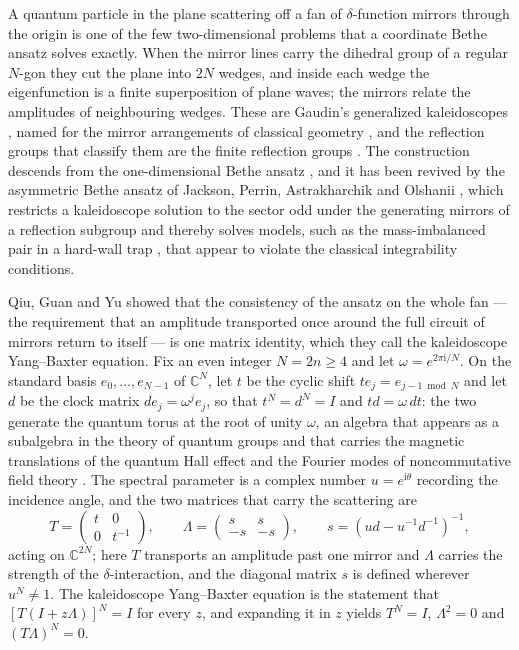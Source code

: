 \documentclass[11pt,reqno]{amsart}
\theoremstyle{plain}
\theoremstyle{definition}
\theoremstyle{remark}
\numberwithin{equation}{section}
\begin{document}
A quantum particle in the plane scattering off a fan of $\delta$-function
mirrors through the origin is one of the few two-dimensional problems that a
coordinate Bethe ansatz solves exactly. When the mirror lines carry the
dihedral group of a regular $N$-gon they cut the plane into $2N$ wedges, and
inside each wedge the eigenfunction is a finite superposition of plane waves;
the mirrors relate the amplitudes of neighbouring wedges. These are Gaudin's
generalized kaleidoscopes \cite[Ch.~5]{Gaudin_Book}, named for the mirror
arrangements of classical geometry \cite{Coxeter_Bookig}, and the reflection
groups that classify them are the finite reflection groups
\cite{Humphreys_Book}. The construction descends from the one-dimensional
Bethe ansatz \cite{Bethe_1931zt,Lieb_1963ea,Lieb_1963ea-1,Yang_1967se,Gaudin_1967us,Yang_1966od,Batchelor_2007tb},
and it has been revived by the asymmetric Bethe ansatz of Jackson, Perrin,
Astrakharchik and Olshanii \cite{Jackson_2024ab,Olshanii_2025es}, which
restricts a kaleidoscope solution to the sector odd under the generating
mirrors of a reflection subgroup \cite{Tumarkin_2005rs} and thereby solves
models, such as the mass-imbalanced pair in a hard-wall trap
\cite{Liu_2019mi}, that appear to violate the classical integrability
conditions.

Qiu, Guan and Yu \cite{Qiu_2026ky} showed that the consistency of the ansatz
on the whole fan --- the requirement that an amplitude transported once around
the full circuit of mirrors return to itself --- is one matrix identity, which
they call the kaleidoscope Yang--Baxter equation. Fix an even integer
$N=2n\ge4$ and let $\omega=e^{2\pi\mathrm{i}/N}$. On the standard basis
$e_{0},\dots,e_{N-1}$ of $\mathbb{C}^{N}$, let $t$ be the cyclic shift
$te_{j}=e_{j-1\bmod N}$ and let $d$ be the clock matrix $de_{j}=\omega^{j}e_{j}$,
so that $t^{N}=d^{N}=I$ and $td=\omega\,dt$: the two generate the quantum
torus at the root of unity $\omega$, an algebra that appears as a subalgebra in
the theory of quantum groups \cite{Levendorskii_1991ao} and that carries the
magnetic translations of the quantum Hall effect
\cite{Bellissard_1994tn} and the Fourier modes of noncommutative field theory
\cite{Douglas_2001nf}. The spectral parameter is a complex number
$u=e^{\mathrm{i}\theta}$ recording the incidence angle, and the two matrices
that carry the scattering are
\begin{equation}
  T=\begin{pmatrix}t&0\\0&t^{-1}\end{pmatrix},
  \qquad
  \Lambda=\begin{pmatrix}s&s\\-s&-s\end{pmatrix},
  \qquad
  s=(ud-u^{-1}d^{-1})^{-1},
  \label{eq:intro-generators}
\end{equation}
acting on $\mathbb{C}^{2N}$; here $T$ transports an amplitude past one mirror
and $\Lambda$ carries the strength of the $\delta$-interaction, and the
diagonal matrix $s$ is defined wherever $u^{N}\ne1$. The kaleidoscope
Yang--Baxter equation is the statement that
$[T(I+z\Lambda)]^{N}=I$ for every $z$, and expanding it in $z$ yields
$T^{N}=I$, $\Lambda^{2}=0$ and $(T\Lambda)^{N}=0$.
\end{document}
